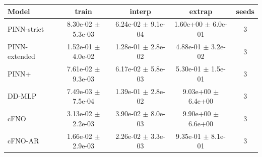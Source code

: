 \begin{tabular}{lcccc}
\toprule
Model & train & interp & extrap & seeds \\
\midrule
PINN-strict & 8.30e-02 $\pm$ 5.3e-03 & 6.24e-02 $\pm$ 9.1e-04 & 1.60e+00 $\pm$ 6.0e-01 & 3 \\
PINN-extended & 1.52e-01 $\pm$ 4.0e-02 & 1.28e-01 $\pm$ 2.8e-02 & 4.88e-01 $\pm$ 3.2e-02 & 3 \\
PINN+ & 7.61e-02 $\pm$ 9.3e-03 & 6.17e-02 $\pm$ 5.8e-03 & 5.30e-01 $\pm$ 1.5e-01 & 3 \\
DD-MLP & 7.49e-03 $\pm$ 7.5e-04 & 1.39e-01 $\pm$ 2.8e-02 & 9.03e+00 $\pm$ 6.4e+00 & 3 \\
cFNO & 3.13e-02 $\pm$ 2.2e-03 & 3.90e-02 $\pm$ 8.0e-03 & 9.90e+00 $\pm$ 6.6e+00 & 3 \\
cFNO-AR & 1.66e-02 $\pm$ 2.9e-03 & 2.26e-02 $\pm$ 3.3e-03 & 9.35e-01 $\pm$ 8.1e-01 & 3 \\
\bottomrule
\end{tabular}
